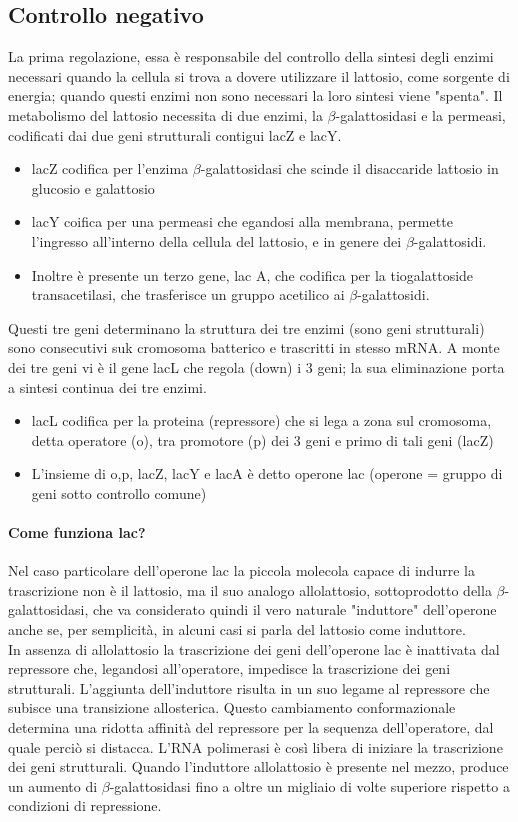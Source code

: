 \documentclass{article}
\begin{document}
\subsection{Controllo negativo}
La prima regolazione, essa è responsabile del controllo della
sintesi degli enzimi necessari quando la cellula si trova a dovere utilizzare il lattosio,
come sorgente di energia; quando questi enzimi non sono necessari la
loro sintesi viene "spenta". Il metabolismo del lattosio necessita di due
enzimi, la $\beta$-galattosidasi e la permeasi, codificati dai due geni strutturali contigui lacZ e lacY.
\begin{itemize}
    \item lacZ codifica per l'enzima $\beta$-galattosidasi che scinde il disaccaride lattosio in glucosio e galattosio
    \item lacY coifica per una permeasi che egandosi alla membrana, permette
    l'ingresso all'interno della cellula del lattosio, e in genere dei $\beta$-galattosidi.
    \item Inoltre è presente un terzo gene, lac A, che codifica per la tiogalattoside transacetilasi, che trasferisce un gruppo acetilico ai $\beta$-galattosidi.
\end{itemize}
Questi tre geni determinano la struttura dei tre enzimi (sono geni strutturali) sono consecutivi suk cromosoma batterico e trascritti in stesso mRNA.
A monte dei tre geni vi è il gene lacL che regola (down) i 3 geni;
la sua eliminazione porta a sintesi continua dei tre enzimi.
\begin{itemize}
    \item lacL codifica per la proteina (repressore) che si lega a zona sul cromosoma, detta operatore (o), tra promotore (p) dei 3 geni e primo di tali geni (lacZ)
    \item L'insieme di o,p, lacZ, lacY e lacA è detto operone lac (operone = gruppo di geni sotto controllo comune)
\end{itemize}
\paragraph{Come funziona lac?} Nel caso particolare dell'operone lac la piccola
molecola capace di indurre la trascrizione non è il lattosio, ma il suo analogo
allolattosio, sottoprodotto della $\beta$-galattosidasi, che va considerato
quindi il vero naturale "induttore" dell'operone anche se, per semplicità, in alcuni casi si parla del lattosio come induttore.\\
In assenza di allolattosio la trascrizione dei geni dell'operone lac è inattivata dal repressore che, legandosi 
all'operatore, impedisce la trascrizione dei geni strutturali. L'aggiunta dell'induttore risulta
in un suo legame al repressore che subisce una transizione allosterica.
Questo
cambiamento conformazionale determina una ridotta affinità del repressore per
la sequenza dell'operatore, dal quale perciò si distacca. L'RNA polimerasi è così
libera di iniziare la trascrizione dei geni strutturali. Quando l'induttore allolattosio è presente nel mezzo, produce un aumento di $\beta$-galattosidasi fino a oltre un
migliaio di volte superiore rispetto a condizioni di repressione.
\end{document}
